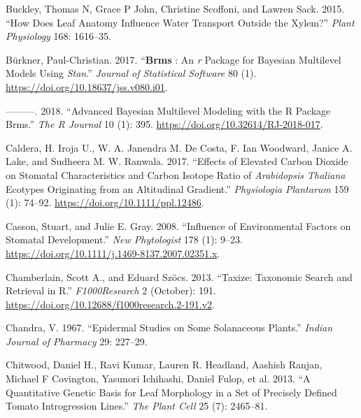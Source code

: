 \documentclass[
  12pt,
]{article}
\newlength{\cslhangindent}
\newlength{\cslentryspacingunit} %
\newenvironment{CSLReferences}[2] %
 {%
  \setlength{\parindent}{0pt}
  \ifodd #1
  \let\oldpar\par
  \def\par{\hangindent=\cslhangindent\oldpar}
  \fi
  \setlength{\parskip}{#2\cslentryspacingunit}
 }%
 {}
\begin{document}
\begin{CSLReferences}{1}{0}
\leavevmode{}%
Buckley, Thomas N, Grace P John, Christine Scoffoni, and Lawren Sack. 2015. {``How Does Leaf Anatomy Influence Water Transport Outside the Xylem?''} \emph{Plant Physiology} 168: 1616--35.

\leavevmode{}%
Bürkner, Paul-Christian. 2017. {``\textbf{Brms} : {An} \emph{r} {Package} for {Bayesian} {Multilevel} {Models} {Using} \emph{Stan}.''} \emph{Journal of Statistical Software} 80 (1). \url{https://doi.org/10.18637/jss.v080.i01}.

\leavevmode{}%
---------. 2018. {``Advanced {Bayesian} {Multilevel} {Modeling} with the {R} {Package} Brms.''} \emph{The R Journal} 10 (1): 395. \url{https://doi.org/10.32614/RJ-2018-017}.

\leavevmode{}%
Caldera, H. Iroja U., W. A. Janendra M. De Costa, F. Ian Woodward, Janice A. Lake, and Sudheera M. W. Ranwala. 2017. {``Effects of Elevated Carbon Dioxide on Stomatal Characteristics and Carbon Isotope Ratio of \emph{{Arabidopsis} Thaliana} Ecotypes Originating from an Altitudinal Gradient.''} \emph{Physiologia Plantarum} 159 (1): 74--92. \url{https://doi.org/10.1111/ppl.12486}.

\leavevmode{}%
Casson, Stuart, and Julie E. Gray. 2008. {``Influence of Environmental Factors on Stomatal Development.''} \emph{New Phytologist} 178 (1): 9--23. \url{https://doi.org/10.1111/j.1469-8137.2007.02351.x}.

\leavevmode{}%
Chamberlain, Scott A., and Eduard Szöcs. 2013. {``Taxize: Taxonomic Search and Retrieval in {R}.''} \emph{F1000Research} 2 (October): 191. \url{https://doi.org/10.12688/f1000research.2-191.v2}.

\leavevmode{}%
Chandra, V. 1967. {``Epidermal Studies on Some {Solanaceous} Plants.''} \emph{Indian Journal of Pharmacy} 29: 227--29.

\leavevmode{}%
Chitwood, Daniel H., Ravi Kumar, Lauren R. Headland, Aashish Ranjan, Michael F Covington, Yasunori Ichihashi, Daniel Fulop, et al. 2013. {``A Quantitative Genetic Basis for Leaf Morphology in a Set of Precisely Defined Tomato Introgression Lines.''} \emph{The Plant Cell} 25 (7): 2465--81.


\end{CSLReferences}
\end{document}
